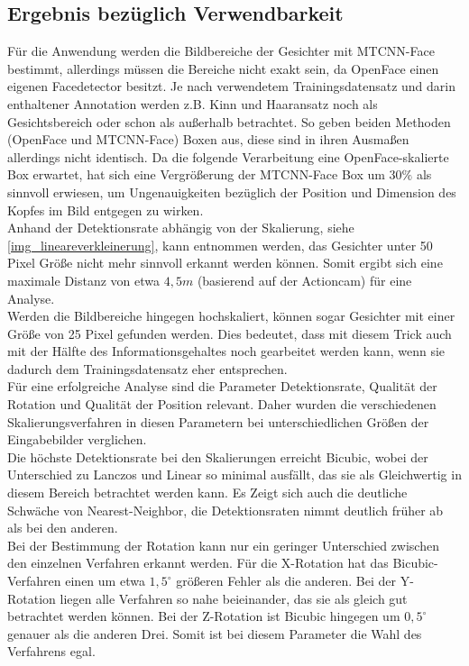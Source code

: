 \subsection{Ergebnis bezüglich Verwendbarkeit}
Für die Anwendung werden die Bildbereiche der Gesichter mit MTCNN-Face bestimmt, allerdings müssen die Bereiche nicht exakt sein, da OpenFace einen eigenen Facedetector besitzt. Je nach verwendetem Trainingsdatensatz und darin enthaltener Annotation werden z.B. Kinn und Haaransatz noch als Gesichtsbereich oder schon als außerhalb betrachtet. So geben beiden Methoden (OpenFace und MTCNN-Face) Boxen aus, diese sind in ihren Ausmaßen allerdings nicht identisch. Da die folgende Verarbeitung eine OpenFace-skalierte Box erwartet, hat sich eine Vergrößerung der MTCNN-Face Box um $30\%$ als sinnvoll erwiesen, um Ungenauigkeiten bezüglich der Position und Dimension des Kopfes im Bild entgegen zu wirken.\\
Anhand der Detektionsrate abhängig von der Skalierung, siehe \autoref{img_lineareverkleinerung}, kann entnommen werden, das Gesichter unter 50 Pixel Größe nicht mehr sinnvoll erkannt werden können. Somit ergibt sich eine maximale Distanz von etwa $4,5m$ (basierend auf der Actioncam) für eine Analyse.\\
Werden die Bildbereiche hingegen hochskaliert, können sogar Gesichter mit einer Größe von 25 Pixel gefunden werden. Dies bedeutet, dass mit diesem Trick auch mit der Hälfte des Informationsgehaltes noch gearbeitet werden kann, wenn sie dadurch dem Trainingsdatensatz eher entsprechen.\\
Für eine erfolgreiche Analyse sind die Parameter Detektionsrate, Qualität der Rotation und Qualität der Position relevant. Daher wurden die verschiedenen Skalierungsverfahren in diesen Parametern bei unterschiedlichen Größen der Eingabebilder verglichen.\\
Die höchste Detektionsrate bei den Skalierungen erreicht Bicubic, wobei der Unterschied zu Lanczos und Linear so minimal ausfällt, das sie als Gleichwertig in diesem Bereich betrachtet werden kann. Es Zeigt sich auch die deutliche Schwäche von Nearest-Neighbor, die Detektionsraten nimmt deutlich früher ab als bei den anderen.\\
Bei der Bestimmung der Rotation kann nur ein geringer Unterschied zwischen den einzelnen Verfahren erkannt werden. Für die X-Rotation hat das Bicubic-Verfahren einen um etwa $1,5^\circ$ größeren Fehler als die anderen. Bei der Y-Rotation liegen alle Verfahren so nahe beieinander, das sie als gleich gut betrachtet werden können. Bei der Z-Rotation ist Bicubic hingegen um $0,5^\circ$ genauer als die anderen Drei. Somit ist bei diesem Parameter die Wahl des Verfahrens egal.\\
